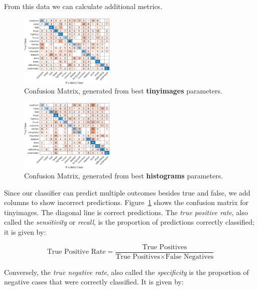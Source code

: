 \documentclass{article}
\begin{document}
\begin{multicols}{2}
From this data we can calculate additional metrics.

\begin{figure}[H]
	\begin{center}
		\includegraphics[width=0.4\textwidth]{tinyimages_confusionmatrix.pdf}
	\end{center}
    \caption{Confusion Matrix, generated from best \textbf{tinyimages} parameters.}
    \label{fig:tinyimages_confusionmatrix}
\end{figure}

\begin{figure}[H]
	\begin{center}
		\includegraphics[width=0.4\textwidth]{histograms_confusionmatrix.pdf}
	\end{center}
    \caption{Confusion Matrix, generated from best \textbf{histograms} parameters.}
    \label{fig:tinyimages_histograms}
\end{figure}

Since our classifier can predict multiple outcomes besides true and false, we add columns to show incorrect predictions. Figure~\ref{fig:tinyimages_confusionmatrix} shows the confusion matrix for tinyimages. The diagonal line is correct predictions. The \textit{true positive rate}, also called the \textit{sensitivity} or \textit{recall}, is the proportion of predictions correctly classified; it is given by:

$$ \mbox{True Positive Rate} = \frac{\mbox{True Positives}}{\mbox{True Positives} \times \mbox{False Negatives}} $$

Conversely, the \textit{true negative rate}, also called the \textit{specificity} is the proportion of negative cases that were correctly classified. It is given by:


\end{multicols}
\end{document}
